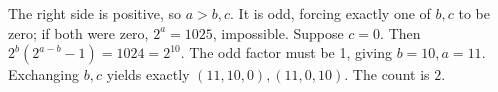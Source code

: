 The right side is positive, so $a>b,c$. It is odd, forcing exactly one of $b,c$ to be zero; if both were zero, $2^a=1025$, impossible. Suppose $c=0$. Then $2^b(2^{a-b}-1)=1024=2^{10}$. The odd factor must be 1, giving $b=10,a=11$. Exchanging $b,c$ yields exactly $(11,10,0),(11,0,10)$. The count is $\boxed2$.
